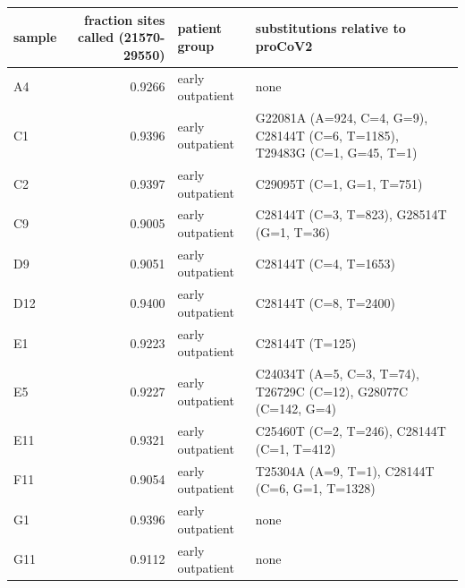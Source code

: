 \documentclass[9pt,twocolumn,twoside]{gsajnl_modified}
\begin{document}
\begin{table}[b!]
{\small
\begin{tabular}{lrll}
\toprule
sample &  fraction sites called (21570-29550) &           patient group &                                        substitutions relative to proCoV2 \\
\midrule
A4 &                               0.9266 &        early outpatient &                                                                          none \\
C1 &                               0.9396 &        early outpatient &  G22081A (A=924, C=4, G=9), C28144T (C=6, T=1185), T29483G (C=1, G=45, T=1) \\
C2 &                               0.9397 &        early outpatient &                                                 C29095T (C=1, G=1, T=751)  \\
C9 &                               0.9005 &        early outpatient &                                  C28144T (C=3, T=823), G28514T (G=1, T=36)  \\
D9 &                               0.9051 &        early outpatient &                                                     C28144T (C=4, T=1653)  \\
D12 &                               0.9400 &        early outpatient &                                                     C28144T (C=8, T=2400)  \\
E1 &                               0.9223 &        early outpatient &                                                           C28144T (T=125)  \\
E5 &                               0.9227 &        early outpatient &              C24034T (A=5, C=3, T=74), T26729C (C=12), G28077C (C=142, G=4)  \\
E11 &                               0.9321 &        early outpatient &                                 C25460T (C=2, T=246), C28144T (C=1, T=412)  \\
F11 &                               0.9054 &        early outpatient &                             T25304A (A=9, T=1), C28144T (C=6, G=1, T=1328)  \\
G1 &                               0.9396 &        early outpatient &                                   none                                        \\
G11 &                               0.9112 &        early outpatient &                                  none                                         \\

\end{tabular}}
\end{table}
\end{document}
